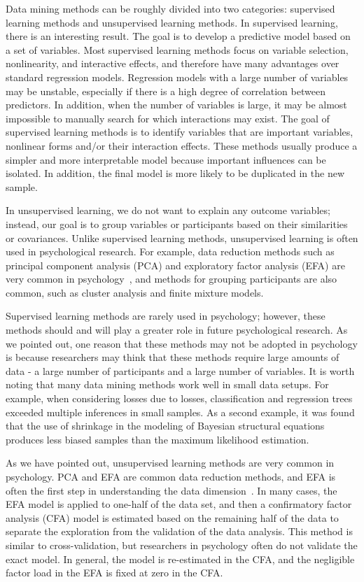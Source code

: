 Data mining methods can be roughly divided into two categories: 
supervised learning methods and unsupervised learning methods. In 
supervised learning, there is an interesting result. The goal is to
 develop a predictive model based on a set of variables. Most 
supervised learning methods focus on variable selection, 
nonlinearity, and interactive effects, and therefore have many 
advantages over standard regression models. Regression models with
 a large number of variables may be unstable, especially if there 
is a high degree of correlation between predictors. In addition, 
when the number of variables is large, it may be almost impossible
 to manually search for which interactions may exist. The goal of 
supervised learning methods is to identify variables that are 
important variables, nonlinear forms and/or their interaction 
effects. These methods usually produce a simpler and more 
interpretable model because important influences can be isolated. 
In addition, the final model is more likely to be duplicated in the
 new sample.

In unsupervised learning, we do not want to explain any outcome 
variables; instead, our goal is to group variables or participants
 based on their similarities or covariances. Unlike supervised 
learning methods, unsupervised learning is often used in 
psychological research. For example, data reduction methods such as
 principal component analysis (PCA) and exploratory factor analysis
 (EFA) are very common in psychology~\cite{editor11}, 
and methods for grouping 
participants are also common, such as cluster analysis and finite 
mixture models.

Supervised learning methods are rarely used in psychology; however,
 these methods should and will play a greater role in future 
psychological research. As we pointed out, one reason that these 
methods may not be adopted in psychology is because researchers may
 think that these methods require large amounts of data - a large 
number of participants and a large number of variables. It is worth
 noting that many data mining methods work well in small data 
setups. For example, when considering losses due to losses, 
classification and regression trees exceeded multiple inferences in
 small samples. As a second example, it was found that the use of 
shrinkage in the modeling of Bayesian 
structural equations produces less biased samples than the maximum
 likelihood estimation.

As we have pointed out, unsupervised learning methods are very 
common in psychology. PCA and EFA are common data reduction 
methods, and EFA is often the first step in understanding the data
 dimension~\cite{editor11}. 
In many cases, the EFA model is applied to one-half of
 the data set, and then a confirmatory factor analysis (CFA) model
 is estimated based on the remaining half of the data to separate 
the exploration from the validation of the data analysis. This 
method is similar to cross-validation, but researchers in 
psychology often do not validate the exact model. In general, the 
model is re-estimated in the CFA, and the negligible factor load 
in the EFA is fixed at zero in the CFA.

